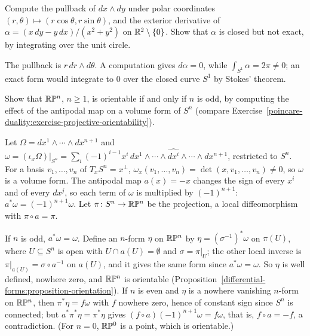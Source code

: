 \begin{exercise}\label{differential-forms:exercise-pullback-computation}
Compute the pullback of $dx \wedge dy$ under polar coordinates $(r, \theta) \mapsto (r\cos\theta, r\sin\theta)$, and the exterior derivative of $\alpha = (x\,dy - y\,dx)/(x^2 + y^2)$ on $\mathbb{R}^2 \setminus \{0\}$.
Show that $\alpha$ is closed but not exact, by integrating over the unit circle.
\end{exercise}

\begin{solution}
The pullback is $r\,dr \wedge d\theta$. A computation gives $d\alpha = 0$, while $\int_{S^1}\alpha = 2\pi \neq 0$; an exact form would integrate to $0$ over the closed curve $S^1$ by Stokes' theorem.
\end{solution}

\begin{exercise}\label{differential-forms:exercise-orientability-projective}
Show that $\mathbb{R}\mathbb{P}^n$, $n \geq 1$, is orientable if and only if $n$ is odd, by computing the effect of the antipodal map on a volume form of $S^n$ (compare
Exercise~\ref{poincare-duality:exercise-projective-orientability}).
\end{exercise}

\begin{solution}
Let $\Omega = dx^1 \wedge \cdots \wedge dx^{n+1}$ and $\omega = (\iota_x\Omega)|_{S^n} = \sum_i(-1)^{i-1}x^i\,dx^1 \wedge \cdots \wedge \widehat{dx^i} \wedge \cdots \wedge dx^{n+1}$, restricted to $S^n$.
For a basis $v_1, \ldots, v_n$ of $T_xS^n = x^\perp$, $\omega_x(v_1, \ldots, v_n) = \det(x, v_1, \ldots, v_n) \neq 0$, so $\omega$ is a volume form. The antipodal map $a(x) = -x$ changes the sign of every
$x^i$ and of every $dx^j$, so each term of $\omega$ is multiplied by $(-1)^{n+1}$: $a^*\omega = (-1)^{n+1}\omega$. Let $\pi \colon S^n \to \mathbb{R}\mathbb{P}^n$ be the projection, a local diffeomorphism with
$\pi \circ a = \pi$.

If $n$ is odd, $a^*\omega = \omega$. Define an $n$-form $\eta$ on $\mathbb{R}\mathbb{P}^n$ by $\eta = (\sigma^{-1})^*\omega$ on $\pi(U)$, where $U \subseteq S^n$ is open with $U \cap a(U) = \emptyset$ and
$\sigma = \pi|_U$; the other local inverse is $\pi|_{a(U)} = \sigma \circ a^{-1}$ on $a(U)$, and it gives the same form since $a^*\omega = \omega$. So $\eta$ is well defined, nowhere zero, and
$\mathbb{R}\mathbb{P}^n$ is orientable (Proposition~\ref{differential-forms:proposition-orientation}). If $n$ is even and $\eta$ is a nowhere vanishing $n$-form on $\mathbb{R}\mathbb{P}^n$, then $\pi^*\eta = f\omega$ with $f$
nowhere zero, hence of constant sign since $S^n$ is connected; but $a^*\pi^*\eta = \pi^*\eta$ gives $(f \circ a)(-1)^{n+1}\omega = f\omega$, that is, $f \circ a = -f$, a contradiction. (For
$n = 0$, $\mathbb{R}\mathbb{P}^0$ is a point, which is orientable.)
\end{solution}

